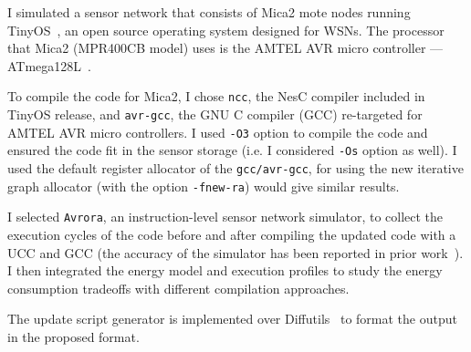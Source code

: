 I simulated a sensor network that consists of Mica2 mote nodes
\cite{mica2-power} running TinyOS~\cite{tinyos},  an open source
operating system designed for WSNs.  The processor that Mica2
(MPR400CB model) uses is the AMTEL AVR micro controller ---
ATmega128L~\cite{atmega128L}.  

To compile the code for Mica2, I chose {\tt ncc}, the NesC compiler
included in TinyOS release, and {\tt avr-gcc}, the GNU C compiler
(GCC) re-targeted for AMTEL AVR micro controllers. I used {\tt -O3}
option to compile the code and ensured the code fit in the sensor
storage (i.e. I considered {\tt -Os} option as well).  I used the
default register allocator of the {\tt gcc/avr-gcc}, for using the new
iterative graph allocator (with the option {\tt -fnew-ra}) would give
similar results.

I selected {\tt Avrora}, an instruction-level sensor network
simulator, to collect the execution cycles of the code before and
after compiling the updated code with a UCC and GCC (the accuracy of the
simulator has been reported in prior work~\cite{avrora}). I then
integrated the energy model and execution profiles to study the energy
consumption tradeoffs with different compilation approaches.

The update script generator is implemented over Diffutils~\cite{diff}
to format the output in the proposed format.



